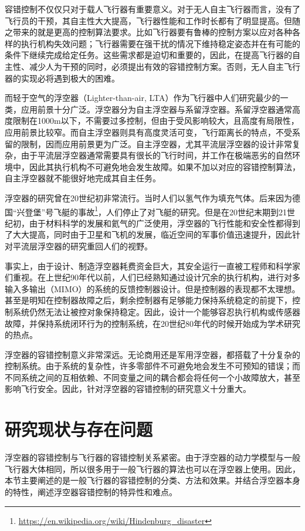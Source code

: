 容错控制不仅仅只对于载人飞行器有重要意义。对于无人自主飞行器而言，没有了飞行员的干预，其自主性大大提高，飞行器性能和工作时长都有了明显提高。但随之带来的就是更高的控制算法要求。比如飞行器要有鲁棒的控制方案以应对各种各样的执行机构失效问题；飞行器需要在强干扰的情况下维持稳定姿态并在有可能的条件下继续完成给定任务。这些需求都是迫切和重要的，因此，在提高飞行器的自主性、减少人为干预的同时，必须提出有效的容错控制方案。否则，无人自主飞行器的实现必将遇到极大的困难。

而轻于空气的浮空器（Lighter-than-air, LTA）作为飞行器中人们研究最少的一类，应用前景十分广泛。浮空器分为自主浮空器与系留浮空器。系留浮空器通常高度限制在1000m以下，不需要过多控制，但由于受风影响较大，且高度有局限性，应用前景比较窄。而自主浮空器则具有高度灵活可变，飞行距离长的特点，不受系留的限制，因而应用前景更为广泛。自主浮空器，尤其平流层浮空器的设计非常复杂，由于平流层浮空器通常需要具有很长的飞行时间，并工作在极端恶劣的自然环境中，因此其执行机构不可避免地会发生故障。如果不加以对应的容错控制算法，自主浮空器就不能很好地完成其自主任务。

浮空器的研究曾在20世纪初非常流行。当时人们以氢气作为填充气体。后来因为德国“兴登堡”号飞艇的事故\footnote{\url{https://en.wikipedia.org/wiki/Hindenburg_disaster}}，人们停止了对飞艇的研究。但是在20世纪末期到21世纪初，由于材料科学的发展和氦气的广泛使用，浮空器的飞行性能和安全性都得到了大大提高，同时由于卫星和飞机的发展，临近空间的军事价值迅速提升，因此针对平流层浮空器的研究重回人们的视野\cite{lutz1998drag,gomes1998airship,jose2002influence,Bessert2005731}。

事实上，由于设计、制造浮空器耗费资金巨大，其安全运行一直被工程师和科学家们重视。在上世纪90年代以前，人们已经熟知通过设计冗余的执行机构，进行对多输入多输出（MIMO）的系统的反馈控制器设计\cite{makarand1988actuator,conner1979fail}。但是控制器的表现都不太理想。甚至是明知在控制器故障之后，剩余控制器有足够能力保持系统稳定的前提下，控制系统仍然无法让被控对象保持稳定\cite{119629}。因此，设计一个能够容忍执行机构或传感器故障，并保持系统闭环行为的控制系统，在20世纪80年代的时候开始成为学术研究的热点。

浮空器的容错控制意义非常深远。无论商用还是军用浮空器，都搭载了十分复杂的控制系统。由于系统的复杂性，许多零部件不可避免地会发生不可预知的错误；而不同系统之间的互相依赖、不同变量之间的耦合都会将任何一个小故障放大，甚至影响飞行安全。因此，针对浮空器的容错控制的研究意义十分重大。

\section{研究现状与存在问题}
浮空器的容错控制与飞行器的容错控制关系紧密。由于浮空器的动力学模型与一般飞行器大体相同，所以很多用于一般飞行器的算法也可以在浮空器上使用。因此，本节主要阐述的是一般飞行器的容错控制的分类、方法和效果。并结合浮空器本身的特性，阐述浮空器容错控制的特异性和难点。

